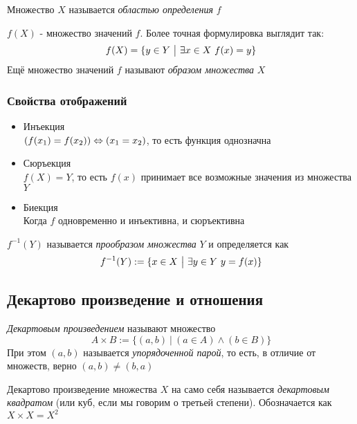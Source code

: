 \begin{definition}
    Множество $X$ называется \textit{областью определения} $f$
\end{definition}

\begin{definition}
    $f(X)$ - множество значений $f$. Более точная формулировка выглядит так:
    $$
    f(X) = \{y \in Y \ \big|\  \exists x \in X\ f(x) = y\}
    $$
    Ещё множество значений $f$ называют \textit{образом множества} $X$
\end{definition}


\subsubsection*{Свойства отображений}

\begin{itemize}
    \item Инъекция \\
    $(f(x_1) = f(x_2)) \Leftrightarrow (x_1 = x_2)$, то есть функция однозначна
    \item Сюръекция \\
    $f(X) = Y$, то есть $f(x)$ принимает все возможные значения из множества $Y$
    \item Биекция \\
    Когда $f$ одновременно и инъективна, и сюръективна
\end{itemize}

\begin{definition}
    $f^{-1}(Y)$ называется \textit{прообразом множества} $Y$ и определяется как
    $$
        f^{-1}(Y) := \{x \in X \ \big|\  \exists y \in Y\ y = f(x)\}
    $$
\end{definition}


\subsection{Декартово произведение и отношения}

\begin{definition}
    \textit{Декартовым произведением} называют множество
    $$
        A \times B := \{(a, b)\ |\ (a \in A) \wedge (b \in B)\}
    $$
    При этом $(a, b)$ называется \textit{упорядоченной парой}, то есть, в отличие от множеств, верно $(a, b) \neq (b, a)$
\end{definition}

\begin{definition}
    Декартово произведение множества $X$ на само себя называется \textit{декартовым квадратом} (или куб, если мы говорим о третьей степени). Обозначается как $X \times X = X^2$
\end{definition}

